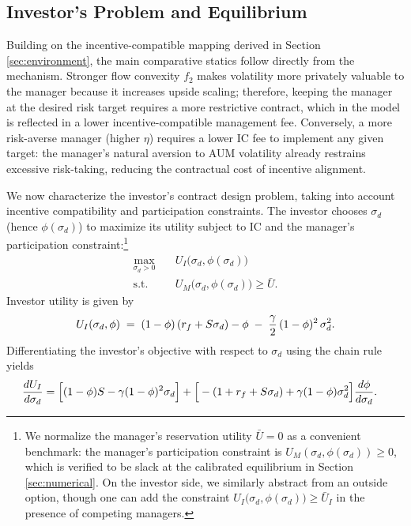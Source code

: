 \subsection{Investor's Problem and Equilibrium}\label{sec:investor}

Building on the incentive-compatible mapping derived in Section
\ref{sec:environment}, the main comparative statics follow directly from
the mechanism. Stronger flow convexity \(f_2\) makes volatility more
privately valuable to the manager because it increases upside scaling;
therefore, keeping the manager at the desired risk target requires a
more restrictive contract, which in the model is reflected in a lower
incentive-compatible management fee. Conversely, a more risk-averse
manager (higher \(\eta\)) requires a lower IC fee to implement any given
target: the manager's natural aversion to AUM volatility already
restrains excessive risk-taking, reducing the contractual cost of
incentive alignment.

We now characterize the investor's contract design problem, taking into
account incentive compatibility and participation constraints. The
investor chooses \(\sigma_d\) (hence \(\phi(\sigma_d)\)) to maximize its
utility subject to IC and the manager's participation
constraint:\footnote{We normalize the manager's reservation utility
  \(\bar{U} = 0\) as a convenient benchmark: the manager's participation
  constraint is \(U_M(\sigma_d, \phi(\sigma_d)) \ge 0\), which is
  verified to be slack at the calibrated equilibrium in Section
  \ref{sec:numerical}. On the investor side, we similarly abstract from
  an outside option, though one can add the constraint
  \(U_I\big(\sigma_d,\phi(\sigma_d)\big) \geq \bar{U}_I\) in the
  presence of competing managers.} \begin{align}
\max_{\sigma_d>0}\quad & U_I\big(\sigma_d,\phi(\sigma_d)\big) \\
\text{s.t.}\quad & U_M\big(\sigma_d,\phi(\sigma_d)\big)\ge \bar U. \nonumber
\end{align} Investor utility is given by \begin{equation}
U_I(\sigma_d,\phi) \;=\; (1-\phi)\,(r_f+S\sigma_d) - \phi \;-\; \frac{\gamma}{2}\,(1-\phi)^2\,\sigma_d^2.
\end{equation} Differentiating the investor's objective with respect to
\(\sigma_d\) using the chain rule yields \begin{align}
\frac{d U_I}{d \sigma_d} &= \Big[(1-\phi)S - \gamma(1-\phi)^2\sigma_d\Big] + \Big[-(1+r_f+S\sigma_d) + \gamma(1-\phi)\sigma_d^2\Big]\frac{d\phi}{d\sigma_d}. \label{eq:investor-FOC}
\end{align}

